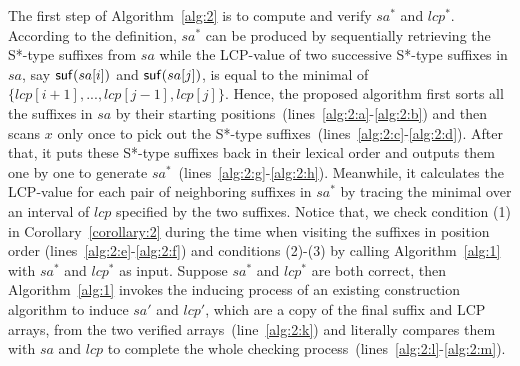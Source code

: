 \documentclass[10pt,journal,compsoc]{IEEEtran}
\begin{document}
The first step of Algorithm~\ref{alg:2} is to compute and verify $sa^*$ and $lcp^*$. According to the definition, $sa^*$ can be produced by sequentially retrieving the S*-type suffixes from $sa$ while the LCP-value of two successive S*-type suffixes in $sa$, say ${\sf suf}(sa[i])$ and ${\sf suf}(sa[j])$, is equal to the minimal of $\{lcp[i + 1], ..., lcp[j - 1], lcp[j]\}$. Hence, the proposed algorithm first sorts all the suffixes in $sa$ by their starting positions~(lines~\ref{alg:2:a}-\ref{alg:2:b}) and then scans $x$ only once to pick out the S*-type suffixes~(lines~\ref{alg:2:c}-\ref{alg:2:d}). After that, it puts these S*-type suffixes back in their lexical order and outputs them one by one to generate $sa^*$~(lines~\ref{alg:2:g}-\ref{alg:2:h}). Meanwhile, it calculates the LCP-value for each pair of neighboring suffixes in $sa^*$ by tracing the minimal over an interval of $lcp$ specified by the two suffixes. Notice that, we check condition (1) in Corollary~\ref{corollary:2} during the time when visiting the suffixes in position order (lines~\ref{alg:2:e}-\ref{alg:2:f}) and conditions (2)-(3) by calling Algorithm~\ref{alg:1} with $sa^*$ and $lcp^*$ as input. Suppose $sa^*$ and $lcp^*$ are both correct, then Algorithm~\ref{alg:1} invokes the inducing process of an existing construction algorithm to induce $sa'$ and $lcp'$, which are a copy of the final suffix and LCP arrays, from the two verified arrays~(line~\ref{alg:2:k}) and literally compares them with $sa$ and $lcp$ to complete the whole checking process~(lines~\ref{alg:2:l}-\ref{alg:2:m}).
\end{document}
